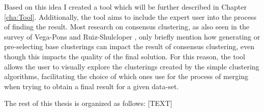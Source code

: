 Based on this idea I created a tool which will be further described in Chapter \ref{cha:Tool}. Additionally, the tool aims to include the expert user into the process of finding the result. Most research on consensus clustering, as also seen in the survey of Vega-Pons and Ruiz-Shulcloper \cite{survey1}, only briefly mention how generating or pre-selecting base clusterings can impact the result of consensus clustering, even though this impacts the quality of the final solution. For this reason, the tool allows the user to visually explore the clusterings created by the simple clustering algorithms, facilitating the choice of which ones use for the process of merging when trying to obtain a final result for a given data-set.

The rest of this thesis is organized as follows: [TEXT]

